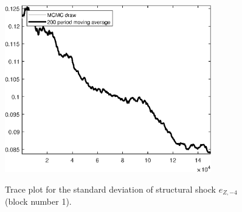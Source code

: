 \begin{figure}[H]
\centering
  \includegraphics[width=0.8\textwidth]{BRS_sectoral_wo_gmf/graphs/TracePlot_SE_e_Z_news_blck_1}\\
    \caption{Trace plot for the standard deviation of structural shock ${e_{Z,-4}}$ (block number 1).}
\end{figure}
